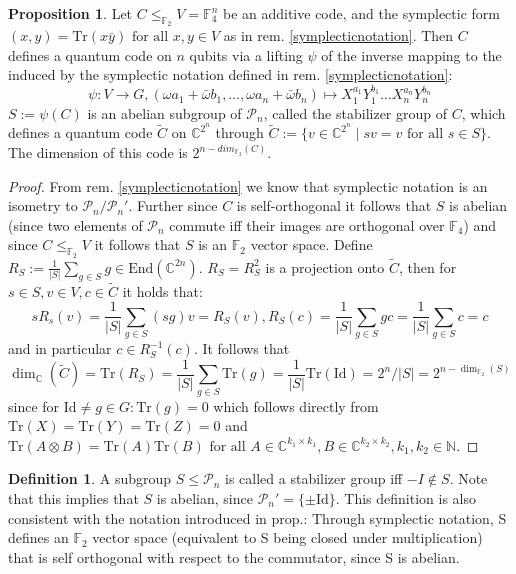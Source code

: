 \documentclass{article}
\def\P{\mathcal{P}}
\def\N{\mathbb{N}}
\def\F{\mathbb{F}}
\def\C{\mathbb{C}}
\def\End{\text{End}}
\def\fa{\text{ for all }}
\def\Tr{\text{Tr}}
\def\Id{\text{Id}}
\theoremstyle{definition}
\newtheorem{prop}[Satz]{Proposition}
\newtheorem{defn}[Satz]{Definition}
\begin{document}
\begin{prop}\label{dimensioncode}
Let $C \leq_{\F_2} V = \F_4^n$ be an additive code, and the symplectic form$ (x,y) = \Tr(x \bar y) \fa x,y \in V$ as in rem. \ref{symplecticnotation}. Then $C$ defines a quantum code on $n$ qubits via a lifting $\psi$ of the inverse mapping to the induced by the symplectic notation defined in rem. \ref{symplecticnotation}:
\[ \psi: V \rightarrow G, (\omega a_1 + \bar \omega b_1, \ldots, \omega a_n + \bar \omega b_n) \mapsto X_1^{a_1}Y_1^{b_1} \ldots X_n^{a_n}Y_n^{b_n} \]
$S:= \psi(C)$ is an abelian subgroup of $\P_n$, called the stabilizer group of $C$, which defines a quantum code $\tilde C$ on $\C^{2^n}$ through $\tilde C := \{ v \in \C^{2^n} \mid sv = v \fa s \in S \}$. The dimension of this code is $2^{n-dim_{\F_2}(C)}$.
\begin{proof}
From rem. \ref{symplecticnotation} we know that symplectic notation is an isometry to $\P_n / \P_n'$. Further since $C$ is self-orthogonal it follows that $S$ is abelian (since two elements of $\P_n$ commute iff their images are orthogonal over $\F_4$) and since $C \leq_{\F_2} V$ it follows that $S$ is an $\F_2$ vector space.
Define $R_S:= \frac{1}{|S|} \sum_{g \in S} g \in \End(\C^{2n})$. $R_S = R_S^2$ is a projection onto $\tilde C$, then for $s \in S, v \in V, c \in \tilde C$ it holds that:   \[ s R_s(v) = \frac{1}{|S|}  \sum_{g \in S} (sg) v = R_S(v),  R_S(c) = \frac{1}{|S|} \sum_{g \in S} gc = \frac{1}{|S|} \sum_{g \in S} c = c \]
and in particular $c \in R_S^{-1}(c)$. It follows that \[ \dim_\C(\tilde C) = \Tr(R_S) = \frac{1}{|S|} \sum_{g \in S} \Tr(g) = \frac{1}{|S|} \Tr(\Id) = 2^n/|S| = 2^{n-\dim_{\F_2}(S)} \] since for $\Id \neq g \in G: \Tr(g) = 0 $ which follows directly from $\Tr(X) = \Tr(Y) = \Tr(Z) = 0$ and $\Tr(A \otimes B)= \Tr(A) \Tr(B) \fa A \in \C^{k_1 \times k_1}, B \in \C^{k_2 \times k_2}, k_1, k_2 \in \N$.
\end{proof}
\end{prop}



\begin{defn}
A subgroup $S \leq \mathcal{P}_n$  is called a stabilizer group iff $-I \notin S$. Note that this implies that $S$ is abelian, since $\P_n' = \{ \pm \Id \}$. This definition is also consistent with the notation introduced in prop.\cite{dimensioncode}: Through symplectic notation, S defines an $\F_2$ vector space (equivalent to S being closed under multiplication) that is self orthogonal with respect to the commutator, since S is abelian.
\end{defn}
\end{document}
